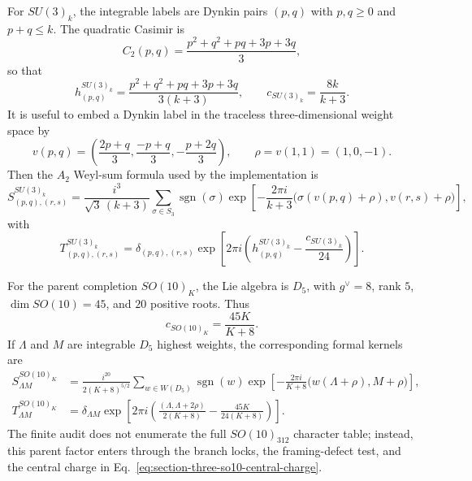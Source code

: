 \documentclass[11pt]{article}
\begin{document}
For $SU(3)_k$, the integrable labels are Dynkin pairs
$(p,q)$ with $p,q\ge0$ and $p+q\le k$.  The quadratic Casimir is
\begin{equation}
\label{eq:section-three-su3-casimir}
 C_2(p,q)
 =
 \frac{p^2+q^2+pq+3p+3q}{3},
\end{equation}
so that
\begin{equation}
\label{eq:section-three-su3-weight}
 h^{SU(3)_k}_{(p,q)}
 =
 \frac{p^2+q^2+pq+3p+3q}{3(k+3)},
 \qquad
 c_{SU(3)_k}=\frac{8k}{k+3}.
\end{equation}
It is useful to embed a Dynkin label in the traceless three-dimensional weight
space by
\begin{equation}
\label{eq:section-three-su3-vector-map}
 v(p,q)
 =
 \left(\frac{2p+q}{3},\frac{-p+q}{3},-\frac{p+2q}{3}\right),
 \qquad
 \rho=v(1,1)=(1,0,-1).
\end{equation}
Then the $A_2$ Weyl-sum formula used by the implementation is
\begin{equation}
\label{eq:section-three-su3-s}
 S^{SU(3)_k}_{(p,q),(r,s)}
 =
 \frac{i^3}{\sqrt3\,(k+3)}
 \sum_{\sigma\in S_3}\operatorname{sgn}(\sigma)
 \exp\!\left[
 -\frac{2\pi i}{k+3}
 \bigl(\sigma(v(p,q)+\rho),v(r,s)+\rho\bigr)
 \right],
\end{equation}
with
\begin{equation}
\label{eq:section-three-su3-t}
 T^{SU(3)_k}_{(p,q),(r,s)}
 =
 \delta_{(p,q),(r,s)}
 \exp\!\left[2\pi i\left(h^{SU(3)_k}_{(p,q)}
 -\frac{c_{SU(3)_k}}{24}\right)\right].
\end{equation}

For the parent completion $SO(10)_K$, the Lie algebra is $D_5$, with
$g^{\vee}=8$, rank $5$, $\dim SO(10)=45$, and $20$ positive roots.  Thus
\begin{equation}
\label{eq:section-three-so10-central-charge}
 c_{SO(10)_K}=\frac{45K}{K+8}.
\end{equation}
If $\Lambda$ and $M$ are integrable $D_5$ highest weights, the corresponding
formal kernels are
\begin{align}
\label{eq:section-three-so10-kernels}
 S^{SO(10)_K}_{\Lambda M}
 &=
 \frac{i^{20}}{2(K+8)^{5/2}}
 \sum_{w\in W(D_5)}\operatorname{sgn}(w)
 \exp\!\left[-\frac{2\pi i}{K+8}
 \bigl(w(\Lambda+\rho),M+\rho\bigr)\right],\nonumber\\
 T^{SO(10)_K}_{\Lambda M}
 &=
 \delta_{\Lambda M}
 \exp\!\left[2\pi i\left(
 \frac{(\Lambda,\Lambda+2\rho)}{2(K+8)}
 -\frac{45K}{24(K+8)}
 \right)\right].
\end{align}
The finite audit does not enumerate the full $SO(10)_{312}$ character table;
instead, this parent factor enters through the branch locks, the framing-defect
test, and the central charge in Eq.~\eqref{eq:section-three-so10-central-charge}.
\end{document}
